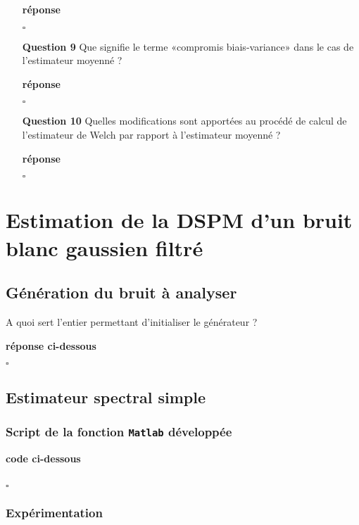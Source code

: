\documentclass{article}
\newcommand{\debutrep}[1]{\color{blue}\begin{center} \hrulefill \textbf{ #1 } \hrulefill \end{center} }
\newcommand{\finrep}{\vspace*{5mm}\hfill $\square$\color{black}\vspace*{5mm}}
\begin{document}
\begin{itemize}
\debutrep{réponse}

\finrep

\item[{\bf Question 9}] Que signifie le terme «compromis biais-variance» dans le cas de l’estimateur moyenné ?

\debutrep{réponse}

\finrep

\item[{\bf Question 10}] Quelles modifications sont apportées au procédé de calcul de l’estimateur de Welch par rapport à l’estimateur moyenné ?

\debutrep{réponse}

\finrep

\end{itemize}

\clearpage
\setcounter{section}{2}
\section{Estimation de la DSPM d'un bruit blanc gaussien filtré}
\subsection{Génération du bruit à analyser}

A quoi sert l'entier permettant d'initialiser le générateur ?

\debutrep{réponse ci-dessous}

\finrep

\subsection{Estimateur spectral simple}
\subsubsection{Script de la fonction {\tt Matlab} développée}

\debutrep{code ci-dessous}
\begin{verbatim}

\end{verbatim}
\finrep

\subsubsection{Expérimentation}
\end{document}
